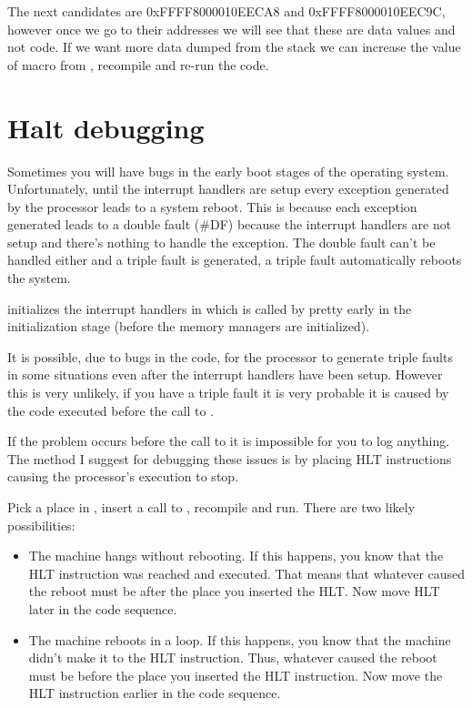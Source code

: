 \begin{appendices}
The next candidates are  0xFFFF8000010EECA8 and  0xFFFF8000010EEC9C, however once we go to their
addresses we will see that these are data values and not code. If we want more data dumped from the
stack we can increase the value of  macro from
, recompile \projectname and re-run the code.

\section{Halt debugging}

Sometimes you will have bugs in the early boot stages of the operating system. Unfortunately, until
the interrupt handlers are setup every exception generated by the processor leads to a system reboot.
This is because each exception generated leads to a double fault (\#DF) because the interrupt
handlers are not setup and there's nothing to handle the exception. The double fault can't be
handled either and a triple fault is generated, a triple fault automatically reboots the system.

\projectname initializes the interrupt handlers in  which is called by
 pretty early in the initialization stage (before the memory managers are
initialized).

It is possible, due to bugs in the code, for the processor to generate triple faults in some
situations even after the interrupt handlers have been setup. However this is very unlikely, if you
have a triple fault it is very probable it is caused by the code executed before the call to
.

If the problem occurs before the call to  it is impossible for
you to log anything. The method I suggest for debugging these issues is by placing HLT instructions
causing the processor's execution to stop.

Pick a place in \projectname, insert a call to , recompile and run. There are two
likely possibilities:
\begin{itemize}
	\item The machine hangs without rebooting. If this happens, you know that the HLT instruction
was reached and executed. That means that whatever caused the reboot must be after the place you
inserted the HLT. Now move HLT later in the code sequence.

	\item The machine reboots in a loop. If this happens, you know that the machine didn't make it
to the HLT instruction. Thus, whatever caused the reboot must be before the place you inserted the
HLT instruction. Now move the HLT instruction earlier in the code sequence.
\end{itemize}


\end{appendices}
